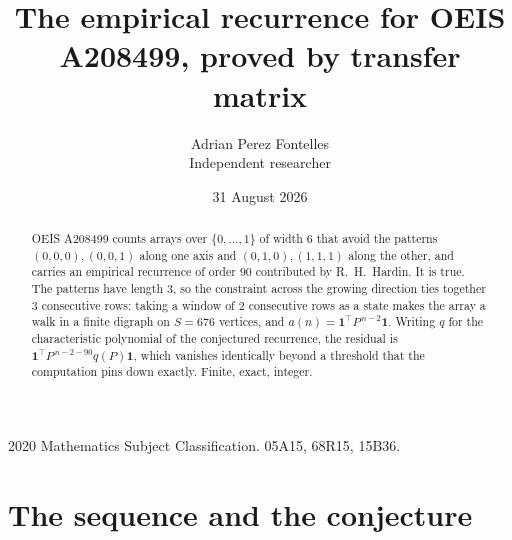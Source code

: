 \documentclass[11pt,a4paper]{article}
\title{The empirical recurrence for OEIS A208499, proved by transfer matrix}
\author{Adrian Perez Fontelles\\ \small Independent researcher}
\date{31 August 2026}
\theoremstyle{plain}
\theoremstyle{definition}
\begin{document}
\maketitle

\begin{abstract}
OEIS A208499 counts arrays over $\{0,\dots,1\}$ of width $6$ that avoid the patterns
$(0,0,0), (0,0,1)$ along one axis and $(0,1,0), (1,1,1)$ along the other, and carries an empirical recurrence of
order $90$ contributed by R.~H.~Hardin. It is true. The patterns have length $3$, so
the constraint across the growing direction ties together $3$ consecutive rows: taking a
window of $2$ consecutive rows as a state makes the array a walk in a finite digraph
on $S=676$ vertices, and $a(n)=\mathbf{1}^{\!\top}P^{\,n-2}\mathbf{1}$. Writing $q$
for the characteristic polynomial of the conjectured recurrence, the residual is
$\mathbf{1}^{\!\top}P^{\,n-2-90}q(P)\mathbf{1}$, which vanishes identically
beyond a threshold that the computation pins down exactly. Finite, exact, integer.
\end{abstract}

\noindent\small 2020 Mathematics Subject Classification. 05A15, 68R15, 15B36.\normalsize

\section{The sequence and the conjecture}
\end{document}
